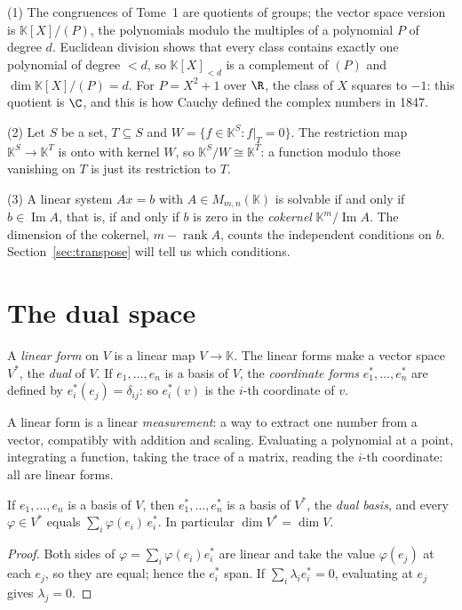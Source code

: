 \begin{example}\label{ex:quotients}
(1) The congruences of Tome~1 are quotients of groups; the vector space version is $\mathbb K[X]/(P)$, the
polynomials modulo the multiples of a polynomial $P$ of degree $d$. Euclidean division shows that every class contains
exactly one polynomial of degree $<d$, so $\mathbb K[X]_{<d}$ is a complement of $(P)$ and $\dim\mathbb K[X]/(P)=d$.
For $P=X^2+1$ over $\R$, the class of $X$ squares to $-1$: this quotient is $\C$, and this is how Cauchy defined the
complex numbers in 1847.

(2) Let $S$ be a set, $T\subseteq S$ and $W=\{f\in\mathbb K^S:f|_T=0\}$. The restriction map $\mathbb K^S\to\mathbb K^T$
is onto with kernel $W$, so $\mathbb K^S/W\cong\mathbb K^T$: a function modulo those vanishing on $T$ is just its
restriction to $T$.

(3) A linear system $Ax=b$ with $A\in M_{m,n}(\mathbb K)$ is solvable if and only if $b\in\operatorname{Im}A$, that is,
if and only if $b$ is zero in the \emph{cokernel} $\mathbb K^m/\operatorname{Im}A$. The dimension of the cokernel,
$m-\operatorname{rank}A$, counts the independent conditions on $b$. Section~\ref{sec:transpose} will tell us which
conditions.
\end{example}

\section{The dual space}

\begin{definition}\label{def:dual}
A \emph{linear form} on $V$ is a linear map $V\to\mathbb K$. The linear forms make a vector space $V^*$, the \emph{dual}
of $V$. If $e_1,\dots,e_n$ is a basis of $V$, the \emph{coordinate forms} $e_1^*,\dots,e_n^*$ are defined by
$e_i^*(e_j)=\delta_{ij}$: so $e_i^*(v)$ is the $i$-th coordinate of $v$.
\end{definition}

A linear form is a linear \emph{measurement}: a way to extract one number from a vector, compatibly with addition and
scaling. Evaluating a polynomial at a point, integrating a function, taking the trace of a matrix, reading the $i$-th
coordinate: all are linear forms.

\begin{proposition}\label{prop:dualbasis}
If $e_1,\dots,e_n$ is a basis of $V$, then $e_1^*,\dots,e_n^*$ is a basis of $V^*$, the \emph{dual basis}, and every
$\varphi\in V^*$ equals $\sum_i\varphi(e_i)\,e_i^*$. In particular $\dim V^*=\dim V$.
\end{proposition}
\begin{proof}
Both sides of $\varphi=\sum_i\varphi(e_i)e_i^*$ are linear and take the value $\varphi(e_j)$ at each $e_j$, so they are
equal; hence the $e_i^*$ span. If $\sum_i\lambda_ie_i^*=0$, evaluating at $e_j$ gives $\lambda_j=0$.
\end{proof}

